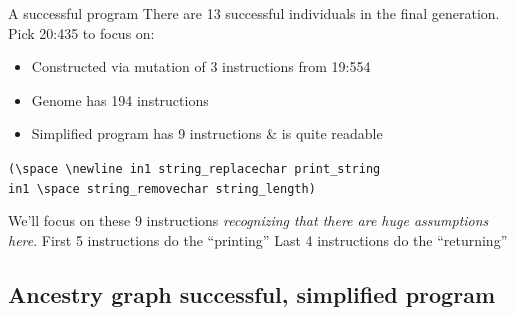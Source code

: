 \documentclass{beamer}
\newcommand{\linespace}{\vskip 0.25cm}
\begin{document}
\begin{frame}{A successful program}
	There are 13 successful individuals in the final generation.
	\linespace
	Pick 20:435 to focus on:
	\begin{itemize}
		\item Constructed via mutation of 3 instructions from 19:554
		\item Genome has 194 instructions
		\item Simplified program has 9 instructions \& is quite readable
	\end{itemize}
	\linespace
	\texttt{(\textbackslash space  \textbackslash newline in1 string\_replacechar print\_string}\\
	\texttt{\quad in1 \textbackslash space string\_removechar string\_length)}
	\linespace
	\begin{overprint}
		We'll focus on these 9 instructions \emph{recognizing that there are huge assumptions here}.
		\onslide<2>
		First 5 instructions do the ``printing''
		\onslide<3>
		Last 4 instructions do the ``returning''
	\end{overprint}
\end{frame}

\subsection{Ancestry graph successful, simplified program}
\end{document}
